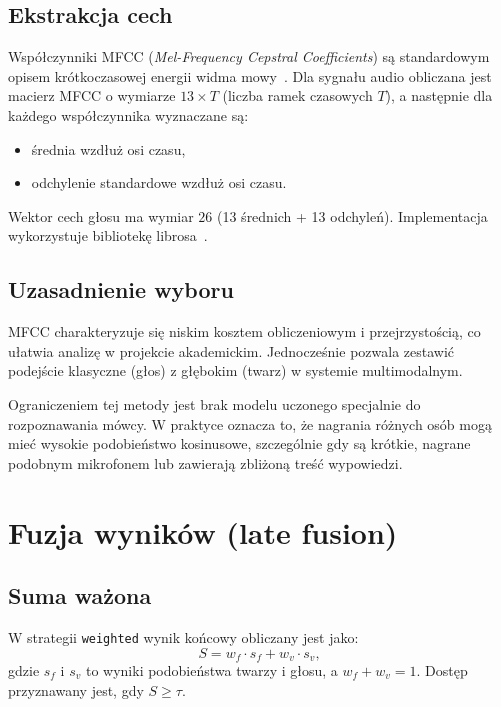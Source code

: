 \subsection{Ekstrakcja cech}

Współczynniki MFCC (\emph{Mel-Frequency Cepstral Coefficients}) są standardowym opisem krótkoczasowej energii widma mowy~\cite{davis1980comparison}. Dla sygnału audio obliczana jest macierz MFCC o wymiarze $13 \times T$ (liczba ramek czasowych $T$), a następnie dla każdego współczynnika wyznaczane są:
\begin{itemize}
    \item średnia wzdłuż osi czasu,
    \item odchylenie standardowe wzdłuż osi czasu.
\end{itemize}

Wektor cech głosu ma wymiar $26$ (13 średnich + 13 odchyleń). Implementacja wykorzystuje bibliotekę librosa~\cite{librosa2024}.

\subsection{Uzasadnienie wyboru}

MFCC charakteryzuje się niskim kosztem obliczeniowym i przejrzystością, co ułatwia analizę w projekcie akademickim. Jednocześnie pozwala zestawić podejście klasyczne (głos) z głębokim (twarz) w systemie multimodalnym.

Ograniczeniem tej metody jest brak modelu uczonego specjalnie do rozpoznawania mówcy. W praktyce oznacza to, że nagrania różnych osób mogą mieć wysokie podobieństwo kosinusowe, szczególnie gdy są krótkie, nagrane podobnym mikrofonem lub zawierają zbliżoną treść wypowiedzi.

\section{Fuzja wyników (late fusion)}

\subsection{Suma ważona}

W strategii \texttt{weighted} wynik końcowy obliczany jest jako:
\begin{equation}
    S = w_f \cdot s_f + w_v \cdot s_v,
    \label{eq:fusion}
\end{equation}
gdzie $s_f$ i $s_v$ to wyniki podobieństwa twarzy i głosu, a $w_f + w_v = 1$. Dostęp przyznawany jest, gdy $S \geq \tau$.

